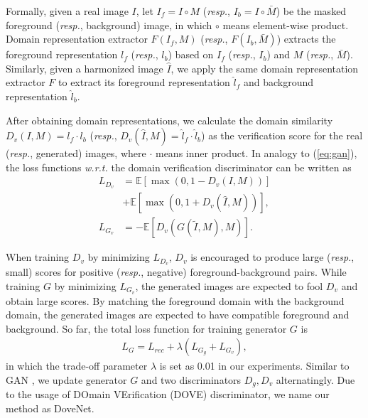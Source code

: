 \documentclass[10pt,twocolumn,letterpaper]{article}
\begin{document}
Formally, given a real image $I$, let $I_f=I\circ M$ (\emph{resp.}, $I_b=I\circ \bar M$) be the masked foreground (\emph{resp.}, background) image, in which $\circ$ means element-wise product.
Domain representation extractor $F(I_f,M)$ (\emph{resp.}, $F(I_b, \bar M)$) extracts the foreground representation $l_f$ (\emph{resp.}, $l_b$) based on $I_f$ (\emph{resp.}, $I_b$) and $M$ (\emph{resp.}, $\bar M$). Similarly, given a harmonized image $\hat I$, we apply the same domain representation extractor $F$ to extract its foreground representation $\hat{l}_f$ and background representation $\hat{l}_b$.


After obtaining domain representations, we calculate the domain similarity $D_v(I, M)=l_f\cdot l_b$ (\emph{resp.}, $D_v(\hat I, M)=\hat{l}_f\cdot \hat{l}_b$) as the verification score for the real (\emph{resp.}, generated) images, where $\cdot$ means inner product. In analogy to (\ref{eq:gan}), the loss functions \emph{w.r.t.} the domain verification discriminator can be written as
\begin{equation}
\begin{aligned}
L_{D_v} &= \mathbb{E}[\max(0, 1-D_v(I, M))] \\
&+ \mathbb{E}[\max(0, 1+D_v(\hat{I}, M))], \\
L_{G_v} &= -\mathbb{E}[D_v(G(\tilde I, M), M)].
\end{aligned}
\end{equation}

When training $D_v$ by minimizing $L_{D_v}$, $D_v$ is encouraged to produce large (\emph{resp.}, small) scores for positive (\emph{resp.}, negative) foreground-background pairs. While training $G$ by minimizing $L_{G_v}$, the generated images are expected to fool $D_v$ and obtain large scores. By matching the foreground domain with the background domain, the generated images are expected to have compatible foreground and background. So far, the total loss function for training generator $G$ is
\begin{eqnarray}
L_G=L_{rec}+\lambda (L_{G_g}+ L_{G_v}),
\end{eqnarray}
in which the trade-off parameter $\lambda$ is set as 0.01 in our experiments. Similar to GAN \cite{goodfellow2014generative}, we update generator $G$ and two discriminators $D_g, D_v$ alternatingly. Due to the usage of DOmain VErification (DOVE) discriminator, we name our method as DoveNet.
\end{document}
